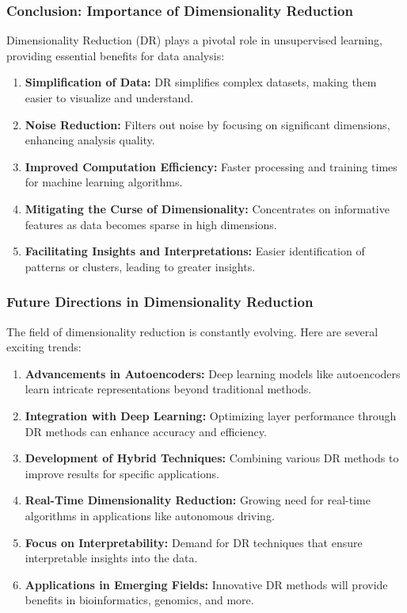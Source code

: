 \documentclass[aspectratio=169]{beamer}
\begin{document}
\begin{frame}[fragile]
    \frametitle{Conclusion: Importance of Dimensionality Reduction}
    
    Dimensionality Reduction (DR) plays a pivotal role in unsupervised learning, providing essential benefits for data analysis:

    \begin{enumerate}
        \item \textbf{Simplification of Data:} DR simplifies complex datasets, making them easier to visualize and understand.
        \item \textbf{Noise Reduction:} Filters out noise by focusing on significant dimensions, enhancing analysis quality.
        \item \textbf{Improved Computation Efficiency:} Faster processing and training times for machine learning algorithms.
        \item \textbf{Mitigating the Curse of Dimensionality:} Concentrates on informative features as data becomes sparse in high dimensions.
        \item \textbf{Facilitating Insights and Interpretations:} Easier identification of patterns or clusters, leading to greater insights.
    \end{enumerate}
\end{frame}

\begin{frame}[fragile]
    \frametitle{Future Directions in Dimensionality Reduction}

    The field of dimensionality reduction is constantly evolving. Here are several exciting trends:

    \begin{enumerate}
        \item \textbf{Advancements in Autoencoders:} Deep learning models like autoencoders learn intricate representations beyond traditional methods.
        \item \textbf{Integration with Deep Learning:} Optimizing layer performance through DR methods can enhance accuracy and efficiency.
        \item \textbf{Development of Hybrid Techniques:} Combining various DR methods to improve results for specific applications.
        \item \textbf{Real-Time Dimensionality Reduction:} Growing need for real-time algorithms in applications like autonomous driving.
        \item \textbf{Focus on Interpretability:} Demand for DR techniques that ensure interpretable insights into the data.
        \item \textbf{Applications in Emerging Fields:} Innovative DR methods will provide benefits in bioinformatics, genomics, and more.
    \end{enumerate}
\end{frame}
\end{document}

